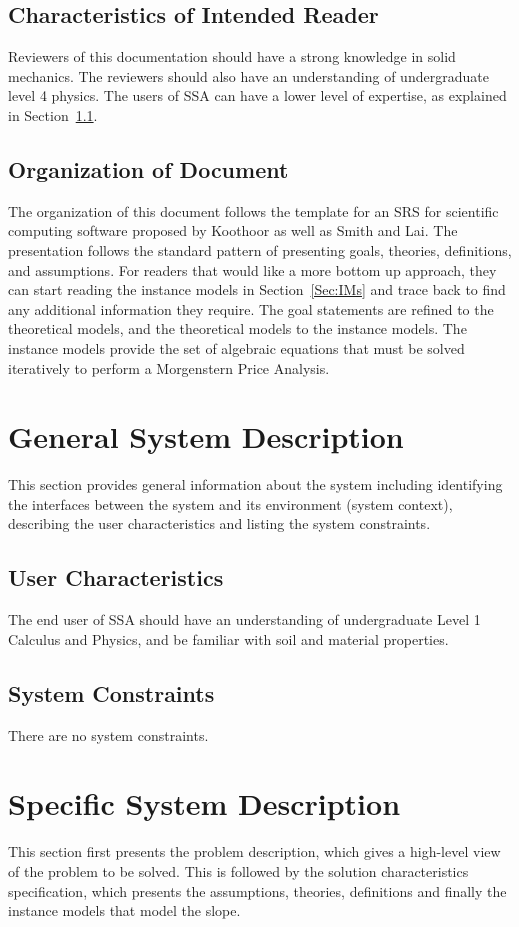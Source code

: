 \documentclass[12pt]{article}
\begin{document}
\subsection{Characteristics of Intended Reader}
\label{Sec:ReaderChars}
Reviewers of this documentation should have a strong knowledge in solid mechanics. The reviewers should also have an understanding of undergraduate level 4 physics. The users of SSA can have a lower level of expertise, as explained in Section~\ref{Sec:UserChars}.
\subsection{Organization of Document}
\label{Sec:DocOrg}
The organization of this document follows the template for an SRS for scientific computing software proposed by Koothoor as well as Smith and Lai. The presentation follows the standard pattern of presenting goals, theories, definitions, and assumptions. For readers that would like a more bottom up approach, they can start reading the instance models in Section~\ref{Sec:IMs} and trace back to find any additional information they require.
The goal statements are refined to the theoretical models, and the theoretical models to the instance models. The instance models provide the set of algebraic equations that must be solved iteratively to perform a Morgenstern Price Analysis.
\section{General System Description}
\label{Sec:GenSysDesc}
This section provides general information about the system including identifying the interfaces between the system and its environment (system context), describing the user characteristics and listing the system constraints.
\subsection{User Characteristics}
\label{Sec:UserChars}
The end user of SSA should have an understanding of undergraduate Level 1 Calculus and Physics, and be familiar with soil and material properties.
\subsection{System Constraints}
\label{Sec:SysConstraints}
There are no system constraints.
\section{Specific System Description}
\label{Sec:SpecSystDesc}
This section first presents the problem description, which gives a high-level view of the problem to be solved. This is followed by the solution characteristics specification, which presents the assumptions, theories, definitions and finally the instance models that model the slope.
\end{document}
